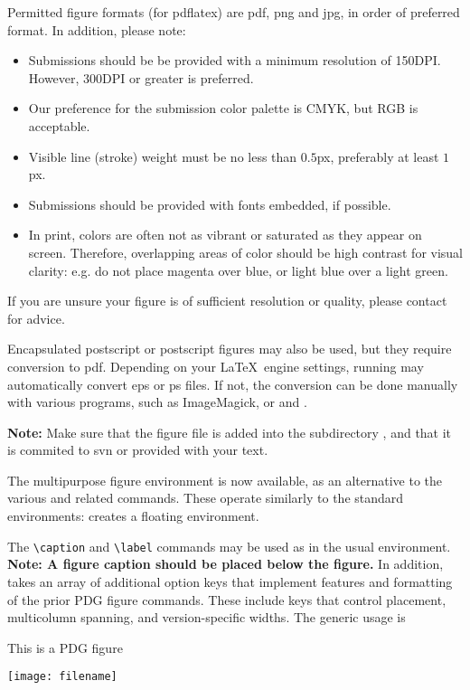 
Permitted figure formats (for pdflatex) are pdf, png and jpg, in order of preferred format. 
In addition, please note:
\begin{itemize}
	\item Submissions should be be provided with a minimum resolution of 150DPI. However, 300DPI or greater is preferred.
	\item Our preference for the submission color palette is CMYK, but RGB is acceptable.
	\item Visible line (stroke) weight must be no less than $0.5$px, preferably at least $1$px.
	\item Submissions should be provided with fonts embedded, if possible.
	\item In print, colors are often not as vibrant or saturated as they appear on screen. Therefore, overlapping areas of color should be high contrast for visual clarity: 
	e.g. do not place magenta over blue, or light blue over a light green.	
\end{itemize}
If you are unsure your figure is of sufficient resolution or quality, please contact  for advice.

Encapsulated postscript or postscript figures may also be used, but they require conversion to pdf. 
Depending on your \LaTeX \ engine settings, running  may automatically convert eps or ps files. 
If not, the conversion can be done manually with various programs, such as ImageMagick, or  and .

\textbf{Note:} Make sure that the figure file is added into the subdirectory , and that it is commited to svn or provided with your text.

The multipurpose figure environment  is now available, as an alternative to the various  and related commands.
These operate similarly to the standard  environments:  creates a floating environment.

The \lstinline!\caption! and \lstinline!\label! commands may be used as in the usual  environment. 
\textbf{Note: A figure caption should be placed below the figure.}
In addition,  takes an array of additional option keys that implement features and formatting of the prior PDG figure commands.
These include keys that control placement, multicolumn spanning, and version-specific widths. 
The generic usage is
\begin{verbtex}
\begin{pdgxfigure}
	\caption{This is a PDG figure}
	\label{examples:fig:label}
	\texttt{[image: filename]} %
\end{pdgxfigure}
\end{verbtex}

